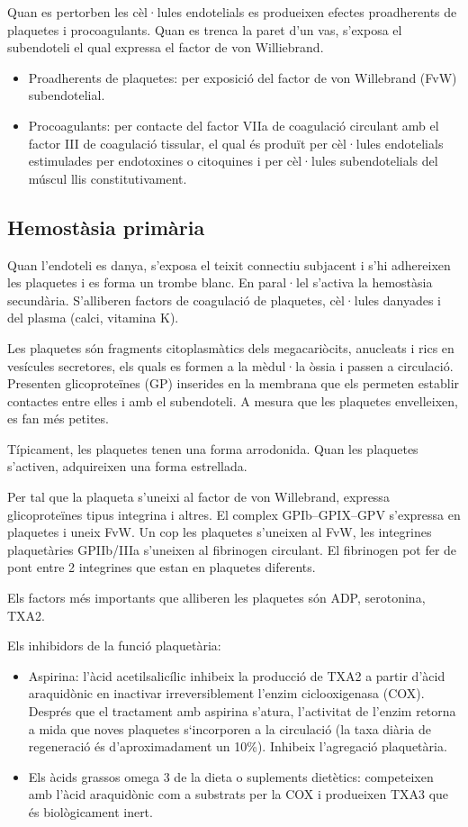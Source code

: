 Quan es pertorben les cèl·lules endotelials es produeixen efectes
proadherents de plaquetes i procoagulants. Quan es trenca la paret
d'un vas, s'exposa el subendoteli el qual expressa el factor de von
Williebrand.
\begin{itemize}
\item Proadherents de plaquetes: per exposició del factor de von
  Willebrand (FvW) subendotelial.
\item Procoagulants: per contacte del factor VIIa de coagulació
  circulant amb el factor III de coagulació tissular, el qual és
  produït per cèl·lules endotelials estimulades per endotoxines o
  citoquines i per cèl·lules subendotelials del múscul llis
  constitutivament.
\end{itemize}

\subsection{Hemostàsia primària}
Quan l'endoteli es danya, s'exposa el teixit connectiu subjacent i
s'hi adhereixen les plaquetes i es forma un trombe blanc. En paral·lel
s'activa la hemostàsia secundària. S'alliberen factors de coagulació
de plaquetes, cèl·lules danyades i del plasma (calci, vitamina K).

Les plaquetes són fragments citoplasmàtics dels megacariòcits,
anucleats i rics en vesícules secretores, els quals es formen a la
mèdul·la òssia i passen a circulació. Presenten glicoproteïnes (GP)
inserides en la membrana que els permeten establir contactes entre
elles i amb el subendoteli. A mesura que les plaquetes envelleixen, es
fan més petites. 

Típicament, les plaquetes tenen una forma arrodonida. Quan les
plaquetes s'activen, adquireixen una forma estrellada.

Per tal que la plaqueta s'uneixi al factor de von Willebrand,
expressa glicoproteïnes tipus integrina i altres. El complex
GPIb–GPIX–GPV s'expressa en plaquetes i uneix FvW. Un cop les
plaquetes s'uneixen al FvW, les integrines plaquetàries GPIIb/IIIa
s'uneixen al fibrinogen circulant. El fibrinogen pot fer de pont entre
2 integrines que estan en plaquetes diferents.

Els factors més importants que alliberen les plaquetes són ADP,
serotonina, TXA2.

Els inhibidors de la funció plaquetària:
\begin{itemize}
\item Aspirina: l’àcid acetilsalicílic inhibeix la producció de TXA2
  a partir d’àcid araquidònic en inactivar irreversiblement l’enzim
  ciclooxigenasa (COX). Després que el tractament amb aspirina
  s'atura, l’activitat de l’enzim retorna a mida que noves plaquetes
  s‘incorporen a la circulació (la taxa diària de regeneració és
  d'aproximadament un 10\%). Inhibeix l'agregació plaquetària.

 
\item Els àcids grassos omega 3 de la dieta o suplements dietètics:
  competeixen amb l’àcid araquidònic com a substrats per la COX i
  produeixen TXA3 que és biològicament inert.
\end{itemize}

